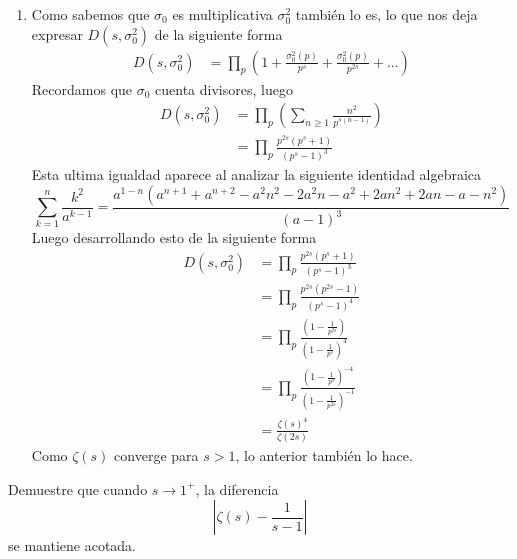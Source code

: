 \begin{sol}
\begin{enumerate}[label = (\roman*)]
        \item Como sabemos que $\sigma_0$ es multiplicativa $\sigma_0^2$ también lo es, lo que nos deja expresar $D(s,\sigma_0^2)$ de la siguiente forma
        \begin{align*}
            D(s,\sigma_0^2)&=\prod_p\left(1+\frac{\sigma_0^2(p)}{p^s}+\frac{\sigma_0^2(p)}{p^{2s}}+...\right)
        \end{align*}
        Recordamos que $\sigma_0$ cuenta divisores, luego
        \begin{align*}
            D(s,\sigma_0^2)&=\prod_p\left(\sum_{n\geq1}\frac{n^2}{p^{s(n-1)}}\right)\\
            &=\prod_p\frac{p^{2s}(p^s+1)}{(p^s-1)^3}
        \end{align*}
        Esta ultima igualdad aparece al analizar la siguiente identidad algebraica\cite{wolfram}
        \[\sum_{k=1}^n \frac{k^2}{a^{k - 1}} = \frac{a^{1 - n} (a^{n + 1} + a^{n + 2} - a^2 n^2 - 2 a^2 n - a^2 + 2 a n^2 + 2 a n - a - n^2)}{(a - 1)^3}\]
        Luego desarrollando esto de la siguiente forma
        \begin{align*}
            D(s,\sigma_0^2)&=\prod_p\frac{p^{2s}(p^s+1)}{(p^s-1)^3}\\
            &=\prod_p\frac{p^{2s}(p^{2s}-1)}{(p^s-1)^4}\\
            &=\prod_p\frac{\left(1-\frac{1}{p^{2s}}\right)}{\left(1-\frac{1}{p^s}\right)^4}\\
            &=\prod_p\frac{\left(1-\frac{1}{p^s}\right)^{-4}}{\left(1-\frac{1}{p^{2s}}\right)^{-1}}\\
            &=\frac{\zeta(s)^4}{\zeta(2s)}
        \end{align*}
        Como $\zeta(s)$ converge para $s>1$, lo anterior también lo hace.
    \end{enumerate}
\end{sol}

\begin{prob}[3 pts.]
    Demuestre que cuando $s\rightarrow1^+$, la diferencia
    \[\left|\zeta(s)-\frac{1}{s-1}\right|\]
    se mantiene acotada.
\end{prob}

